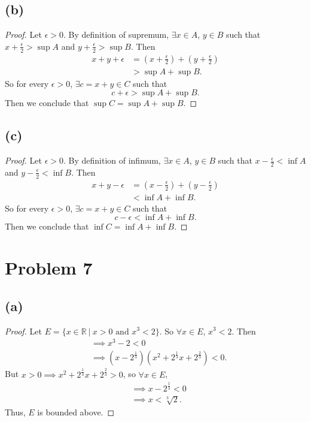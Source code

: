 \documentclass{article}
\begin{document}
\subsection*{(b)}
\begin{proof}
	Let $\epsilon > 0$. By definition of supremum, $\exists x \in A$, $y\in B$ such that $x + \frac{\epsilon}{2} > \sup{A}$ and $y + \frac{\epsilon}{2} > \sup{B}$. Then
	\begin{align}
		x + y + \epsilon &= \left(x+\frac{\epsilon}{2}\right) + \left(y+\frac{\epsilon}{2}\right) \\
		&> \sup{A} + \sup{B}.
	\end{align} 
	So for every $\epsilon >0$, $\exists c = x+y \in C$ such that 
	\begin{equation}
		c + \epsilon > \sup{A} + \sup{B}. 
	\end{equation}
	Then we conclude that $\sup{C} = \sup{A} + \sup{B}$. 
\end{proof}

\subsection*{(c)}
\begin{proof}
	Let $\epsilon > 0$. By definition of infimum, $\exists x \in A$, $y\in B$ such that $x - \frac{\epsilon}{2} < \inf{A}$ and $y - \frac{\epsilon}{2} < \inf{B}$. Then
	\begin{align}
		x + y - \epsilon &= \left(x-\frac{\epsilon}{2}\right) + \left(y-\frac{\epsilon}{2}\right) \\
		&< \inf{A} + \inf{B}.
	\end{align} 
	So for every $\epsilon >0$, $\exists c = x+y \in C$ such that 
	\begin{equation}
		c - \epsilon < \inf{A} + \inf{B}. 
	\end{equation}
	Then we conclude that $\inf{C} = \inf{A} + \inf{B}$.
\end{proof}

\section*{Problem 7}
\subsection*{(a)}
\begin{proof}
	Let $E = \{x\in\mathbb{R} \: | \: x>0 \textrm{ and } x^3 < 2\}$. So $\forall x \in E$, $x^3 < 2$. Then
	\begin{align}
		&\implies x^3 - 2 < 0 \\
		&\implies \left(x-2^{\frac{1}{3}}\right)\left(x^2 + 2^{\frac{1}{3}}x + 2^{\frac{2}{3}}\right) < 0.
	\end{align}
	But $x>0 \implies x^2 + 2^{\frac{1}{3}}x + 2^{\frac{2}{3}} > 0$, so $\forall x \in E$, 
	\begin{align}
		&\implies x-2^{\frac{1}{3}} < 0 \\
		&\implies x < \sqrt[3]{2}.
	\end{align}
	Thus, $E$ is bounded above.
\end{proof}
\end{document}
